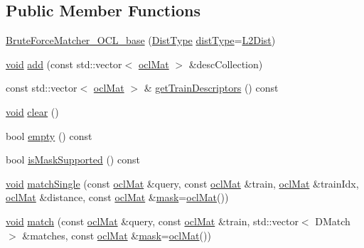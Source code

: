 \subsection*{Public Member Functions}
\begin{DoxyCompactItemize}
\item 
\hyperlink{classcv_1_1ocl_1_1BruteForceMatcher__OCL__base_a2b787265970bd80836f9dd15249f7aa1}{Brute\-Force\-Matcher\-\_\-\-O\-C\-L\-\_\-base} (\hyperlink{classcv_1_1ocl_1_1BruteForceMatcher__OCL__base_a138bb23658e4007b7bb3c0f294075e68}{Dist\-Type} \hyperlink{classcv_1_1ocl_1_1BruteForceMatcher__OCL__base_a5f9e04f63994ff96aa4a6b17b11f6f8c}{dist\-Type}=\hyperlink{classcv_1_1ocl_1_1BruteForceMatcher__OCL__base_a138bb23658e4007b7bb3c0f294075e68a72ee9970d2cadd04468a41459aece56e}{L2\-Dist})
\item 
\hyperlink{legacy_8hpp_a8bb47f092d473522721002c86c13b94e}{void} \hyperlink{classcv_1_1ocl_1_1BruteForceMatcher__OCL__base_aa5bbacdf86b8576c0b303a47a2e75a70}{add} (const std\-::vector$<$ \hyperlink{classcv_1_1ocl_1_1oclMat}{ocl\-Mat} $>$ \&desc\-Collection)
\item 
const std\-::vector$<$ \hyperlink{classcv_1_1ocl_1_1oclMat}{ocl\-Mat} $>$ \& \hyperlink{classcv_1_1ocl_1_1BruteForceMatcher__OCL__base_a30e3c67a532cc63fb820533e0c4ec4d0}{get\-Train\-Descriptors} () const 
\item 
\hyperlink{legacy_8hpp_a8bb47f092d473522721002c86c13b94e}{void} \hyperlink{classcv_1_1ocl_1_1BruteForceMatcher__OCL__base_a967d2d54b84fca4eb0ecad39670ed3ca}{clear} ()
\item 
bool \hyperlink{classcv_1_1ocl_1_1BruteForceMatcher__OCL__base_aa0fb9ba146269213084c200e815d200d}{empty} () const 
\item 
bool \hyperlink{classcv_1_1ocl_1_1BruteForceMatcher__OCL__base_aa0a356448e14ba2370fc616624d8418a}{is\-Mask\-Supported} () const 
\item 
\hyperlink{legacy_8hpp_a8bb47f092d473522721002c86c13b94e}{void} \hyperlink{classcv_1_1ocl_1_1BruteForceMatcher__OCL__base_aa4fcdb9ce44d9b021ce4582489e3fa1a}{match\-Single} (const \hyperlink{classcv_1_1ocl_1_1oclMat}{ocl\-Mat} \&query, const \hyperlink{classcv_1_1ocl_1_1oclMat}{ocl\-Mat} \&train, \hyperlink{classcv_1_1ocl_1_1oclMat}{ocl\-Mat} \&train\-Idx, \hyperlink{classcv_1_1ocl_1_1oclMat}{ocl\-Mat} \&distance, const \hyperlink{classcv_1_1ocl_1_1oclMat}{ocl\-Mat} \&\hyperlink{tracking_8hpp_a6b13ecd2fd6ec7ad422f1d7863c3ad19}{mask}=\hyperlink{classcv_1_1ocl_1_1oclMat}{ocl\-Mat}())
\item 
\hyperlink{legacy_8hpp_a8bb47f092d473522721002c86c13b94e}{void} \hyperlink{classcv_1_1ocl_1_1BruteForceMatcher__OCL__base_ae5966aaa82666edef2aaa842aa8cb8a4}{match} (const \hyperlink{classcv_1_1ocl_1_1oclMat}{ocl\-Mat} \&query, const \hyperlink{classcv_1_1ocl_1_1oclMat}{ocl\-Mat} \&train, std\-::vector$<$ D\-Match $>$ \&matches, const \hyperlink{classcv_1_1ocl_1_1oclMat}{ocl\-Mat} \&\hyperlink{tracking_8hpp_a6b13ecd2fd6ec7ad422f1d7863c3ad19}{mask}=\hyperlink{classcv_1_1ocl_1_1oclMat}{ocl\-Mat}())

\end{DoxyCompactItemize}

